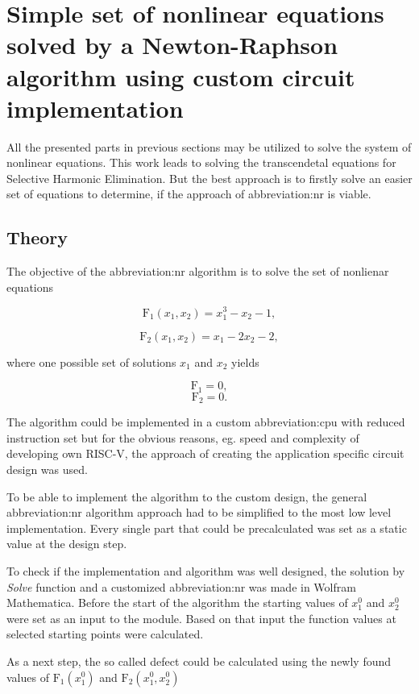 \documentclass[a4paper, twoside, 11pt]{article}
\begin{document}
\section{Simple set of nonlinear equations solved by a Newton-Raphson algorithm using custom circuit implementation}\label{sec:simple-set-of-nonlinear-equations-solved-by-a-newton-raphson-algorithm-using-custom-circuit-implementation}
    All the presented parts in previous sections may be utilized to solve the system of nonlinear equations. This work leads to solving the transcendetal equations for Selective Harmonic Elimination. But the best approach is to firstly solve an easier set of equations to determine, if the approach of \gls{abbreviation:nr} is viable.
    \subsection{Theory}
        The objective of the \gls{abbreviation:nr} algorithm is to solve the set of nonlienar equations


        \begin{equation}
            \text{F}_1 (x_1, x_2) = x_1^3 - x_2 - 1, 
        \end{equation}

        \begin{equation}
            \text{F}_2 (x_1, x_2) = x_1 - 2 x_2 - 2, 
        \end{equation}

        where one possible set of solutions $x_1$ and $x_2$ yields

        \begin{equation}
            \text{F}_1 = 0, 
        \end{equation}
        \begin{equation}
            \text{F}_2 = 0.
        \end{equation}

        \par
        The algorithm could be implemented in a custom \gls{abbreviation:cpu} with reduced instruction set but for the obvious reasons, eg. speed and complexity of developing own RISC-V, the approach of creating the application specific circuit design was used.\par
        To be able to implement the algorithm to the custom design, the general \gls{abbreviation:nr} algorithm approach had to be simplified to the most low level implementation. Every single part that could be precalculated was set as a static value at the design step.\par
        To check if the implementation and algorithm was well designed, the solution by \textit{Solve} function and a customized \gls{abbreviation:nr} was made in Wolfram Mathematica. Before the start of the algorithm the starting values of $x_1^0$ and $x_2^0$ were set as an input to the module. Based on that input the function values at selected starting points were calculated.\par
        As a next step, the so called defect could be calculated using the newly found values of $\text{F}_1 (x_1^0)$ and $\text{F}_2 (x_1^0, x_2^0)$
\end{document}
